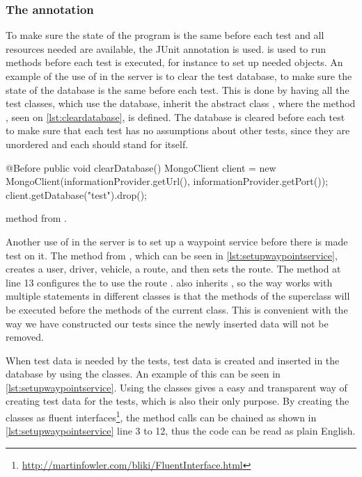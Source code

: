 \subsubsection*{The  annotation}
To make sure the state of the program is the same before each test and all resources needed are available,
the JUnit annotation  is used.
 is used to run methods before each test is executed,
for instance to set up needed objects\cite{before_doc}.
An example of the use of  in the server is to clear the test database,
to make sure the state of the database is the same before each test.
This is done by having all the test classes, which use the database, inherit the abstract class ,
where the method , seen on \cref{lst:cleardatabase}, is defined.
The database is cleared before each test to make sure that each test has no assumptions about other tests,
since they are unordered and each should stand for itself.

\begin{listing}
    \begin{java2}
        @Before
        public void clearDatabase() {
            MongoClient client = new MongoClient(informationProvider.getUrl(), informationProvider.getPort());
            client.getDatabase("test").drop();
        }
    \end{java2}
    \caption{ method from .}
    \label{lst:cleardatabase}
\end{listing}

Another use of  in the server is to set up a waypoint service before there is made test on it.
The method  from ,
which can be seen in \cref{lst:setupwaypointservice},
creates a user, driver, vehicle, a route, and then sets the route.
The  method at line 13 configures the  to use the route .
 also inherits ,
so the way  works with multiple  statements in different classes
is that the  methods of the superclass will be executed before the  methods of the current class\cite{before_doc}.
This is convenient with the way we have constructed our tests since the newly inserted data will not be removed.

\bigskip

When test data is needed by the tests, test data is created and inserted in the database by using the  classes.
An example of this can be seen in \cref{lst:setupwaypointservice}.
Using the  classes gives a easy and transparent way of creating test data for the tests, which is also their only purpose.
By creating the  classes as fluent interfaces\footnote{\url{http://martinfowler.com/bliki/FluentInterface.html}}, the method calls can be chained as shown in \cref{lst:setupwaypointservice} line 3 to 12,
thus the code can be read as plain English.

